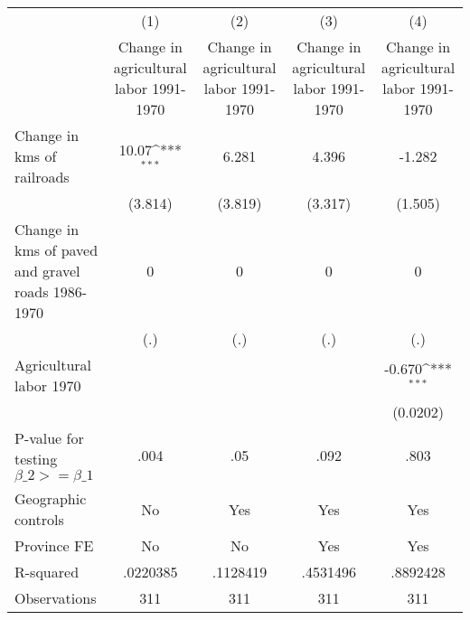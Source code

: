 {
\def\sym#1{\ifmmode^{#1}\else\(^{#1}\)\fi}
\begin{tabular}{l*{4}{c}}
\hline\hline
                &\multicolumn{1}{c}{(1)}&\multicolumn{1}{c}{(2)}&\multicolumn{1}{c}{(3)}&\multicolumn{1}{c}{(4)}\\
                &\multicolumn{1}{c}{Change in agricultural labor 1991-1970}&\multicolumn{1}{c}{Change in agricultural labor 1991-1970}&\multicolumn{1}{c}{Change in agricultural labor 1991-1970}&\multicolumn{1}{c}{Change in agricultural labor 1991-1970}\\
\hline
Change in kms of railroads&    10.07\sym{***}&    6.281         &    4.396         &   -1.282         \\
                &  (3.814)         &  (3.819)         &  (3.317)         &  (1.505)         \\
[1em]
Change in kms of paved and gravel roads 1986-1970&        0         &        0         &        0         &        0         \\
                &      (.)         &      (.)         &      (.)         &      (.)         \\
[1em]
Agricultural labor 1970&                  &                  &                  &   -0.670\sym{***}\\
                &                  &                  &                  & (0.0202)         \\
\hline
P-value for testing $\beta\_{2} >= \beta\_{1}$&     .004         &      .05         &     .092         &     .803         \\
Geographic controls&       No         &      Yes         &      Yes         &      Yes         \\
Province FE     &       No         &       No         &      Yes         &      Yes         \\
R-squared       & .0220385         & .1128419         & .4531496         & .8892428         \\
Observations    &      311         &      311         &      311         &      311         \\
\hline\hline
\end{tabular}
}
